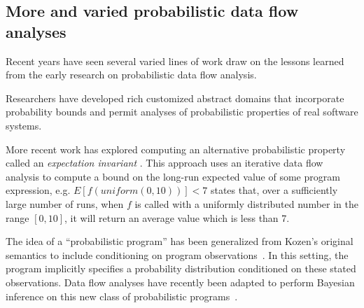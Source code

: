 \subsection{More and varied probabilistic data flow analyses}
Recent years have seen several varied lines of work draw on
the lessons learned from the early research on probabilistic
data flow analysis.

Researchers have developed rich customized abstract domains that 
incorporate probability bounds \cite{mardziel2013dynamic,adje2014static}
and permit analyses of probabilistic properties of real software systems.

More recent work has explored computing an alternative probabilistic
property called an {\sl expectation invariant} \cite{chakarov2014expectation}.
This approach uses an iterative data flow analysis to 
compute a bound on the long-run expected value of
some program expression, e.g. $E[f(\mathit{uniform}(0,10))] < 7$ states that,
over a sufficiently large number of runs, when $f$ is called with
a uniformly distributed number in the range $[0,10]$, it will return
an average value which is less than 7.

The idea of a ``probabilistic program'' has been generalized from
Kozen's original semantics to include conditioning on program
observations~\cite{Gordon2014}.
In this setting, the program implicitly specifies a probability 
distribution conditioned on these stated observations.
Data flow analyses have recently been adapted to perform Bayesian
inference on this new class of probabilistic 
programs~\cite{claret2013bayesian}.  
